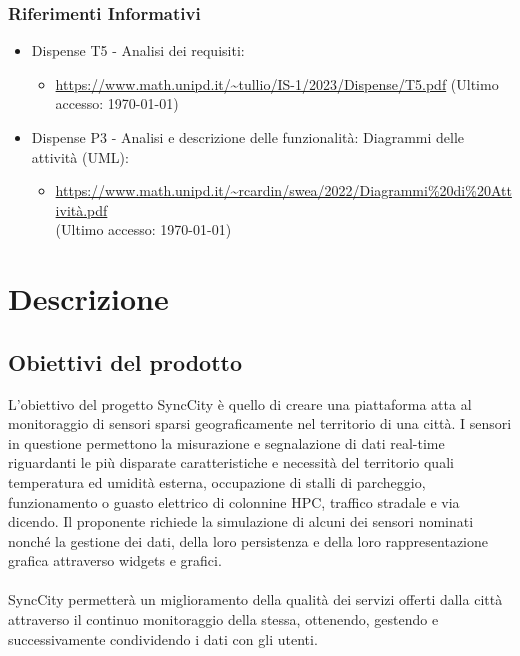 \documentclass[8pt]{article}
\begin{document}
\subsubsection{Riferimenti Informativi}
\begin{itemize}
	\setlength\itemsep{0em}
	\item Dispense T5 - Analisi dei requisiti:
    \begin{itemize}
        \item \href{https://www.math.unipd.it/~tullio/IS-1/2023/Dispense/T5.pdf}{https://www.math.unipd.it/\textasciitilde{}tullio/IS-1/2023/Dispense/T5.pdf} (Ultimo accesso: \today)
    \end{itemize}
    \item Dispense P3 - Analisi e descrizione delle funzionalità: Diagrammi delle attività (UML):
        \begin{itemize}
            \item
                \href{https://www.math.unipd.it/~rcardin/swea/2022/Diagrammi\%20di\%20Attivita.pdf}{https://www.math.unipd.it/\textasciitilde{}rcardin/swea/2022/Diagrammi\%20di\%20Attivit\`{a}.pdf}
                \\ (Ultimo accesso: \today)
        \end{itemize}
\end{itemize}
\newpage

\section{Descrizione}
\subsection{Obiettivi del prodotto}
L'obiettivo del progetto SyncCity è quello di creare una piattaforma atta al monitoraggio di sensori
sparsi geograficamente nel territorio di una città. I sensori in questione permettono la misurazione
e segnalazione di dati real-time riguardanti le più disparate caratteristiche e necessità del
territorio quali temperatura ed umidità esterna, occupazione di stalli di parcheggio, funzionamento
o guasto elettrico di colonnine HPC, traffico stradale e via dicendo. Il proponente richiede la
simulazione di alcuni dei sensori nominati nonché la gestione dei dati, della loro persistenza e
della loro rappresentazione grafica attraverso widgets e grafici. \\\\SyncCity permetterà un miglioramento della qualità dei servizi offerti dalla città attraverso il continuo monitoraggio della stessa, ottenendo, gestendo e successivamente condividendo i dati con gli utenti. 
\end{document}
